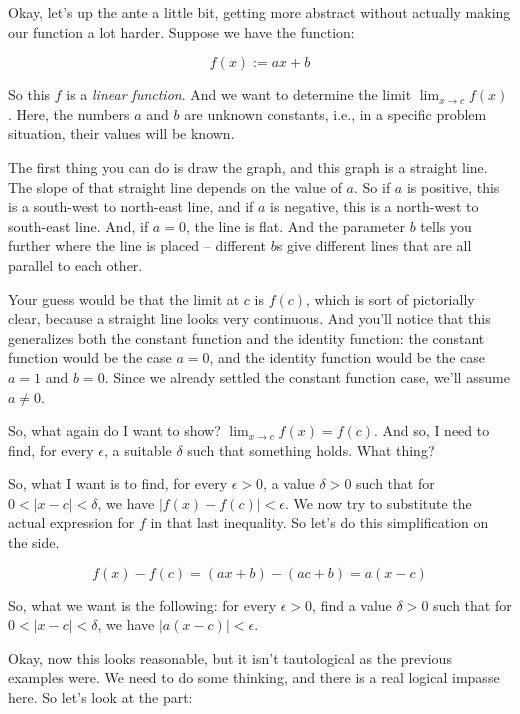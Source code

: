 \documentclass[10pt]{amsart}
\begin{document}
Okay, let's up the ante a little bit, getting more abstract without
actually making our function a lot harder. Suppose we have the
function:

\begin{equation*}
  f(x) := ax + b
\end{equation*}

So this $f$ is a {\em linear function}. And we want to determine the
limit $\lim_{x \to c} f(x)$. Here, the numbers $a$ and $b$ are unknown
constants, i.e., in a specific problem situation, their values will be
known.

The first thing you can do is draw the graph, and this graph is a
straight line. The slope of that straight line depends on the value of
$a$. So if $a$ is positive, this is a south-west to north-east line,
and if $a$ is negative, this is a north-west to south-east line. And,
if $a = 0$, the line is flat. And the parameter $b$ tells you further
where the line is placed -- different $b$s give different lines that
are all parallel to each other.

Your guess would be that the limit at $c$ is $f(c)$, which is sort of
pictorially clear, because a straight line looks very continuous. And
you'll notice that this generalizes both the constant function and the
identity function: the constant function would be the case $a = 0$,
and the identity function would be the case $a = 1$ and $b = 0$. Since
we already settled the constant function case, we'll assume $a \ne 0$.

So, what again do I want to show? $\lim_{x \to c} f(x) = f(c)$. And
so, I need to find, for every $\epsilon$, a suitable $\delta$ such
that something holds. What thing?

So, what I want is to find, for every $\epsilon > 0$, a value $\delta
> 0$ such that for $0 < |x - c| < \delta$, we have $|f(x) - f(c)| <
\epsilon$. We now try to substitute the actual expression for $f$ in
that last inequality. So let's do this simplification on the side.

$$f(x) - f(c) = (ax + b) - (ac + b) = a(x - c)$$

So, what we want is the following: for every $\epsilon > 0$, find a
value $\delta > 0$ such that for $0 < |x - c| < \delta$, we have $|a(x
- c)| < \epsilon$.

Okay, now this looks reasonable, but it isn't tautological as the
previous examples were. We need to do some thinking, and there is a
real logical impasse here. So let's look at the part:
\end{document}
